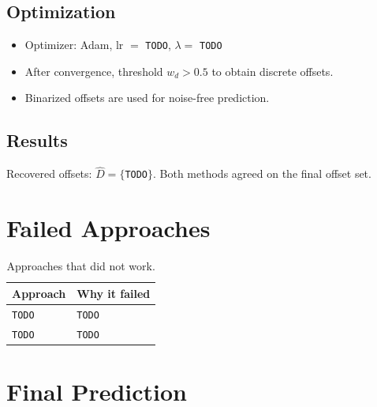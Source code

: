 \documentclass[10pt,twocolumn]{article}
\begin{document}
\subsection{Optimization}


\begin{itemize}
  \item Optimizer: Adam, lr $= $ \texttt{TODO}, $\lambda = $ \texttt{TODO}
  \item After convergence, threshold $w_d > 0.5$ to obtain discrete offsets.
  \item Binarized offsets are used for noise-free prediction.
\end{itemize}

\subsection{Results}


Recovered offsets: $\hat{D} = \{$\texttt{TODO}$\}$.
Both methods agreed on the final offset set.

\section{Failed Approaches}
\label{sec:failed}

\begin{table}[h]
\centering
\small
\begin{tabular}{@{}lp{4.6cm}@{}}
\toprule
Approach & Why it failed \\
\midrule
\texttt{TODO} & \texttt{TODO} \\
\texttt{TODO} & \texttt{TODO} \\
\bottomrule
\end{tabular}
\caption{Approaches that did not work.}
\label{tab:failed}
\end{table}

\section{Final Prediction}
\label{sec:result}
\end{document}
